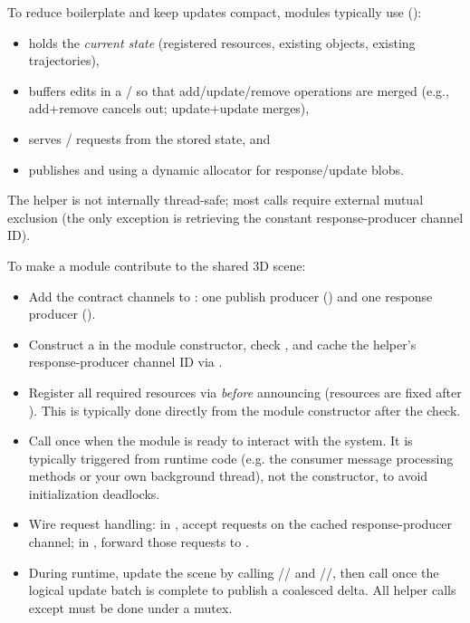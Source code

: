 To reduce boilerplate and keep updates compact, modules typically use  ():
\begin{itemize}
    \item holds the \emph{current state} (registered resources, existing objects, existing trajectories),
    \item buffers edits in a  /  so that add/\allowbreak update/\allowbreak remove operations are merged (e.g., add+remove cancels out; update+update merges),
    \item serves / requests from the stored state, and
    \item publishes  and  using a dynamic allocator for response/update blobs.
\end{itemize}
The helper is not internally thread-safe; most calls require external mutual exclusion (the only exception is retrieving the constant response-producer channel ID).

To make a module contribute to the shared 3D scene:
\begin{itemize}
    \item Add the contract channels to : one publish producer () and one response producer ().
    \item Construct a  in the module constructor, check , and cache the helper's response-producer channel ID via .
    \item Register all required resources via  \emph{before} announcing (resources are fixed after ). This is typically done directly from the module constructor after the  check.
    \item Call  once when the module is ready to interact with the system. It is typically triggered from runtime code (e.g. the consumer message processing methods or your own background thread), not the constructor, to avoid initialization deadlocks.
    \item Wire request handling: in , accept requests on the cached response-producer channel; in , forward those requests to .
    \item During runtime, update the scene by calling // and //, then call  once the logical update batch is complete to publish a coalesced delta. All helper calls except  must be done under a mutex.
\end{itemize}

